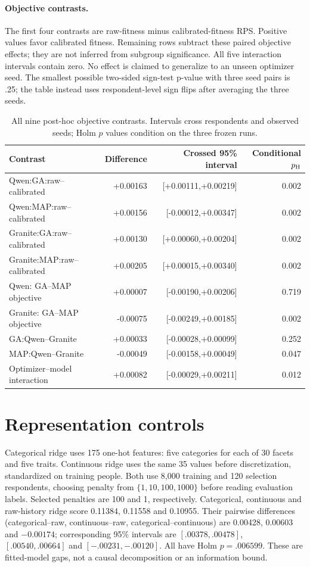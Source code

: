 \documentclass[sigconf,anonymous]{aamas}
\begin{document}
\paragraph{Objective contrasts.}
The first four contrasts are raw-fitness minus calibrated-fitness RPS.
Positive values favor calibrated fitness. Remaining rows subtract these
paired objective effects; they are not inferred from subgroup significance.
All five interaction intervals contain zero. No effect is claimed to generalize
to an unseen optimizer seed. The smallest possible two-sided sign-test p-value
with three seed pairs is .25; the table instead uses respondent-level sign flips
after averaging the three seeds.
\begin{table}[t]\centering\small
\caption{All nine post-hoc objective contrasts. Intervals cross respondents and observed seeds; Holm $p$ values condition on the three frozen runs.}
\begin{tabular}{@{}lrrr@{}}\toprule
Contrast & Difference & Crossed 95\% interval & Conditional $p_{\rm H}$\\\midrule
Qwen:GA:raw--calibrated & +0.00163 & [+0.00111,+0.00219] & 0.002\\
Qwen:MAP:raw--calibrated & +0.00156 & [-0.00012,+0.00347] & 0.002\\
Granite:GA:raw--calibrated & +0.00130 & [+0.00060,+0.00204] & 0.002\\
Granite:MAP:raw--calibrated & +0.00205 & [+0.00015,+0.00340] & 0.002\\
Qwen: GA--MAP objective & +0.00007 & [-0.00190,+0.00206] & 0.719\\
Granite: GA--MAP objective & -0.00075 & [-0.00249,+0.00185] & 0.002\\
GA:Qwen--Granite & +0.00033 & [-0.00028,+0.00099] & 0.252\\
MAP:Qwen--Granite & -0.00049 & [-0.00158,+0.00049] & 0.047\\
Optimizer--model interaction & +0.00082 & [-0.00029,+0.00211] & 0.012\\
\bottomrule\end{tabular}\end{table}

\section{Representation controls}
Categorical ridge uses 175 one-hot features: five categories for each of
30 facets and five traits. Continuous ridge uses the same 35 values before
discretization, standardized on training people. Both use 8,000 training and
120 selection respondents, choosing penalty from $\{1,10,100,1000\}$ before
reading evaluation labels. Selected penalties are 100 and 1, respectively.
Categorical, continuous and raw-history ridge score 0.11384, 0.11558 and
0.10955. Their pairwise differences (categorical--raw, continuous--raw,
categorical--continuous) are 0.00428, 0.00603 and $-0.00174$; corresponding
95\% intervals are $[.00378,.00478]$, $[.00540,.00664]$ and
$[-.00231,-.00120]$. All have Holm $p=.006599$. These are fitted-model
gaps, not a causal decomposition or an information bound.
\end{document}
